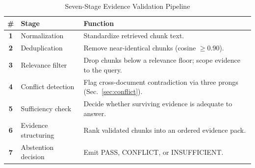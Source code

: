 \documentclass[conference]{IEEEtran}
\begin{document}
\begin{table}[htbp]
\caption{Seven-Stage Evidence Validation Pipeline}
\label{tab:validation}
\centering
\small
\begin{tabularx}{\columnwidth}{@{}>{\bfseries}c l X@{}}
\toprule
\# & Stage & Function \\
\midrule
1 & Normalization      & Standardize retrieved chunk text. \\
2 & Deduplication      & Remove near-identical chunks (cosine $\geq 0.90$). \\
3 & Relevance filter   & Drop chunks below a relevance floor; scope evidence to the query. \\
4 & Conflict detection & Flag cross-document contradiction via three prongs (Sec.~\ref{sec:conflict}). \\
5 & Sufficiency check  & Decide whether surviving evidence is adequate to answer. \\
6 & Evidence structuring & Rank validated chunks into an ordered evidence pack. \\
7 & Abstention decision & Emit PASS, CONFLICT, or INSUFFICIENT. \\
\bottomrule
\end{tabularx}
\end{table}
\end{document}
